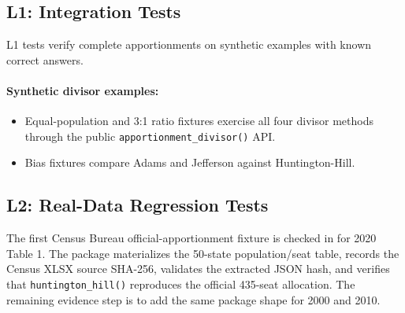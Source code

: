 \subsection{L1: Integration Tests}

L1 tests verify complete apportionments on synthetic examples with known correct
answers.

\paragraph{Synthetic divisor examples:}
\begin{itemize}
  \item Equal-population and 3:1 ratio fixtures exercise all four divisor
    methods through the public \texttt{apportionment\_divisor()} API.
  \item Bias fixtures compare Adams and Jefferson against Huntington-Hill.
\end{itemize}

\subsection{L2: Real-Data Regression Tests}

The first Census Bureau official-apportionment fixture is checked in for 2020
Table 1.  The package materializes the 50-state population/seat table, records
the Census XLSX source SHA-256, validates the extracted JSON hash, and verifies
that \texttt{huntington\_hill()} reproduces the official 435-seat allocation.
The remaining evidence step is to add the same package shape for 2000 and 2010.
